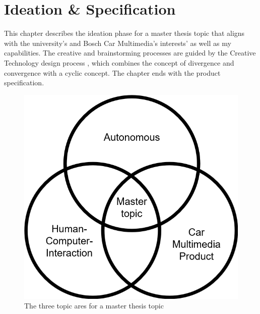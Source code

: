 \chapter{Ideation \& Specification}
\label{ch:ideation}
This chapter describes the ideation phase for a master thesis topic that aligns with the university's and Bosch Car Multimedia's interests' as well as my capabilities. The creative and brainstorming processes are guided by the Creative Technology design process \cite{Mader2014ATechnology}, which combines the concept of divergence and convergence with a cyclic concept. The chapter ends with the product specification.

\begin{figure}
    \includegraphics[height=0.4\textwidth]{fig/MasterTopic.png}
    \caption[Workshop]{The three topic ares for a master thesis topic}
    \label{fig:mastertopic}
\end{figure}

